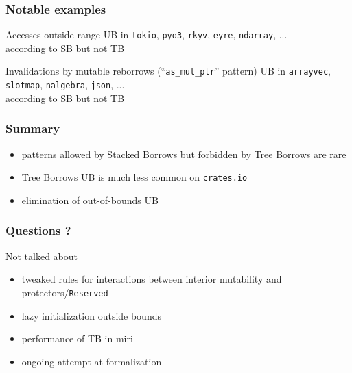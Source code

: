 \begin{frame}
    \frametitle{Notable examples}
    \begin{block}{Accesses outside range}
        UB in \texttt{tokio}, \texttt{pyo3}, \texttt{rkyv}, \texttt{eyre}, \texttt{ndarray}, ...\\
        according to SB but not TB
    \end{block}
    \begin{block}{Invalidations by mutable reborrows (``\texttt{as\_mut\_ptr}'' pattern)}
        UB in \texttt{arrayvec}, \texttt{slotmap}, \texttt{nalgebra}, \texttt{json}, ...\\
        according to SB but not TB
    \end{block}
\end{frame}

\begin{frame}
    \frametitle{Summary}
    \begin{itemize}
        \item patterns allowed by Stacked Borrows but forbidden by Tree Borrows are rare
        \item Tree Borrows UB is much less common on \texttt{crates.io}
        \item elimination of out-of-bounds UB
    \end{itemize}
\end{frame}



\begin{frame}
    \frametitle{Questions ?}

    Not talked about
    \begin{itemize}
        \item tweaked rules for interactions between interior mutability and protectors/\texttt{Reserved}
        \item lazy initialization outside bounds
        \item performance of TB in miri
        \item ongoing attempt at formalization
    \end{itemize}
\end{frame}
